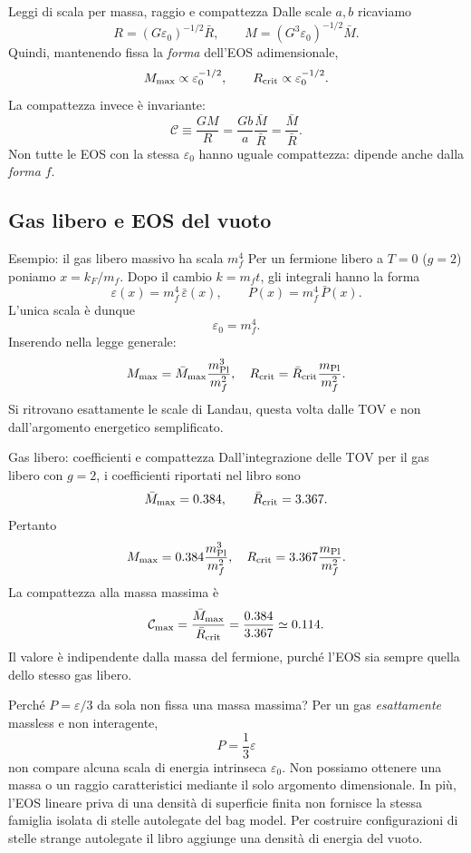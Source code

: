 \begin{frame}[t]{Leggi di scala per massa, raggio e compattezza}
\small
Dalle scale $a,b$ ricaviamo
\[
R=(G\varepsilon_0)^{-1/2}\bar R,
\qquad M=(G^3\varepsilon_0)^{-1/2}\bar M.
\]
Quindi, mantenendo fissa la \emph{forma} dell'EOS adimensionale,
\[
M_{\max}\propto\varepsilon_0^{-1/2},
\qquad R_{\rm crit}\propto\varepsilon_0^{-1/2}.
\]
La compattezza invece è invariante:
\[
\mathcal C\equiv\frac{GM}{R}=\frac{Gb}{a}\frac{\bar M}{\bar R}
=\frac{\bar M}{\bar R}.
\]
Non tutte le EOS con la stessa $\varepsilon_0$ hanno uguale compattezza: dipende anche dalla \emph{forma} $f$.
\end{frame}

\subsection{Gas libero e EOS del vuoto}

\begin{frame}[t]{Esempio: il gas libero massivo ha scala $m_f^4$}
\small
Per un fermione libero a $T=0$ ($g=2$) poniamo $x=k_F/m_f$. Dopo il cambio $k=m_ft$, gli integrali hanno la forma
\[
\varepsilon(x)=m_f^4\,\bar\varepsilon(x),\qquad
P(x)=m_f^4\,\bar P(x).
\]
L'unica scala è dunque
\[
\varepsilon_0=m_f^4.
\]
Inserendo nella legge generale:
\[
M_{\max}=\bar M_{\max}\frac{m_{\rm Pl}^3}{m_f^2},
\quad R_{\rm crit}=\bar R_{\rm crit}\frac{m_{\rm Pl}}{m_f^2}.
\]
Si ritrovano esattamente le scale di Landau, questa volta dalle TOV e non dall'argomento energetico semplificato.
\end{frame}

\begin{frame}[t]{Gas libero: coefficienti e compattezza}
\small
Dall'integrazione delle TOV per il gas libero con $g=2$, i coefficienti riportati nel libro sono
\[
\bar M_{\max}=0.384,\qquad
\bar R_{\rm crit}=3.367.
\]
Pertanto
\[
M_{\max}=0.384\frac{m_{\rm Pl}^3}{m_f^2},
\quad R_{\rm crit}=3.367\frac{m_{\rm Pl}}{m_f^2}.
\]
La compattezza alla massa massima è
\[
\mathcal C_{\max}=\frac{\bar M_{\max}}{\bar R_{\rm crit}}
=\frac{0.384}{3.367}\simeq0.114.
\]
Il valore è indipendente dalla massa del fermione, purché l'EOS sia sempre quella dello stesso gas libero.
\end{frame}

\begin{frame}[t]{Perché $P=\varepsilon/3$ da sola non fissa una massa massima?}
\small
Per un gas \emph{esattamente} massless e non interagente,
\[
P=\frac13\varepsilon
\]
non compare alcuna scala di energia intrinseca $\varepsilon_0$.
\medskip
Non possiamo ottenere una massa o un raggio caratteristici mediante il solo argomento dimensionale. In più, l'EOS lineare priva di una densità di superficie finita non fornisce la stessa famiglia isolata di stelle autolegate del bag model.
\medskip
Per costruire configurazioni di stelle strange autolegate il libro aggiunge una densità di energia del vuoto.
\end{frame}


